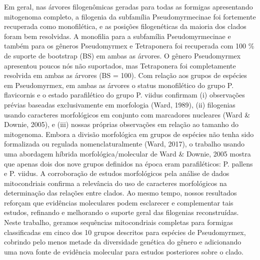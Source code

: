 \documentclass[../DISSERTACAO_MAIN.tex]{subfiles}
\begin{document}
	Em geral, nas árvores filogenômicas geradas para todas as formigas apresentando mitogenoma completo, a filogenia da subfamília Pseudomyrmecinae foi fortemente recuperada como monofilética, e as posições filogenéticas da maioria dos clados foram bem resolvidas. A monofilia para a subfamília Pseudomyrmecinae e também para os gêneros Pseudomyrmex e Tetraponera foi recuperada com 100 \% de suporte de bootstrap (BS) em ambas as árvores. O gênero Pseudomyrmex apresentou poucos nós não suportados, mas Tetraponera foi completamente resolvida em ambas as árvores (BS = 100). Com relação aos grupos de espécies em Pseudomyrmex, em ambas as árvores o status monofilético do grupo P. flavicornis e o estado parafilético do grupo P. viidus confirmam (i) observações prévias baseadas exclusivamente em morfologia (Ward, 1989), (ii) filogenias usando caracteres morfológicos em conjunto com marcadores nucleares (Ward \& Downie, 2005), e (iii) nossas próprias observações em relação ao tamanho do mitogenoma. Embora a divisão morfológica em grupos de espécies não tenha sido formalizada ou regulada nomenclaturalmente (Ward, 2017), o trabalho usando uma abordagem híbrida morfológica/molecular de Ward \& Downie, 2005 mostra que apenas dois dos nove grupos definidos na época eram parafiléticos: P. pallens e P. viidus. A corroboração de estudos morfológicos pela análise de dados mitocondriais confirma a relevância do uso de caracteres morfológicos na determinação das relações entre clados. Ao mesmo tempo, nossos resultados reforçam que evidências moleculares podem esclarecer e complementar tais estudos, refinando e melhorando o suporte geral das filogenias reconstruídas. Neste trabalho, geramos sequências mitocondriais completas para formigas classificadas em cinco dos 10 grupos descritos para espécies de Pseudomyrmex, cobrindo pelo menos metade da diversidade genética do gênero e adicionando uma nova fonte de evidência molecular para estudos posteriores sobre o clado.
	
\end{document}
